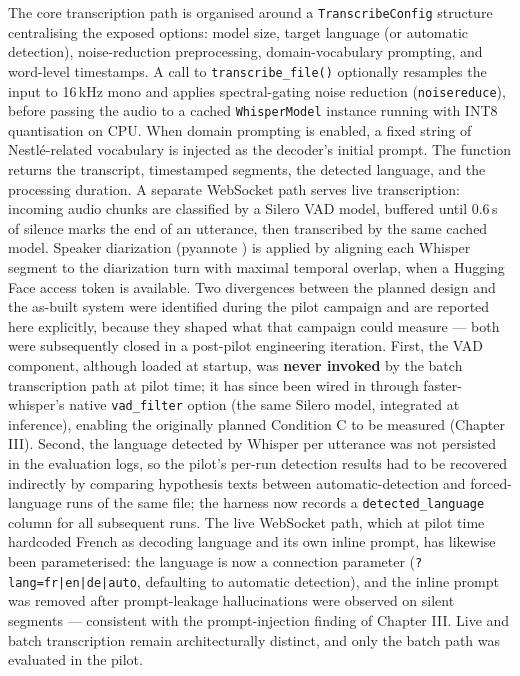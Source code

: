 \documentclass[12pt]{report}
\begin{document}
The core transcription path is organised around a \texttt{TranscribeConfig} structure centralising the exposed options: model size, target language (or automatic detection), noise-reduction preprocessing, domain-vocabulary prompting, and word-level timestamps. A call to \texttt{transcribe\_file()} optionally resamples the input to 16\,kHz mono and applies spectral-gating noise reduction (\texttt{noisereduce}), before passing the audio to a cached \texttt{WhisperModel} instance running with INT8 quantisation on CPU. When domain prompting is enabled, a fixed string of Nestl\'e-related vocabulary is injected as the decoder's initial prompt. The function returns the transcript, timestamped segments, the detected language, and the processing duration. A separate WebSocket path serves live transcription: incoming audio chunks are classified by a Silero VAD model, buffered until 0.6\,s of silence marks the end of an utterance, then transcribed by the same cached model. Speaker diarization (pyannote \cite{bredin2020pyannote}) is applied by aligning each Whisper segment to the diarization turn with maximal temporal overlap, when a Hugging Face access token is available.
Two divergences between the planned design and the as-built system were identified during the pilot campaign and are reported here explicitly, because they shaped what that campaign could measure --- both were subsequently closed in a post-pilot engineering iteration. First, the VAD component, although loaded at startup, was \textbf{never invoked} by the batch transcription path at pilot time; it has since been wired in through faster-whisper's native \texttt{vad\_filter} option (the same Silero model, integrated at inference), enabling the originally planned Condition C to be measured (Chapter III). Second, the language detected by Whisper per utterance was not persisted in the evaluation logs, so the pilot's per-run detection results had to be recovered indirectly by comparing hypothesis texts between automatic-detection and forced-language runs of the same file; the harness now records a \texttt{detected\_language} column for all subsequent runs. The live WebSocket path, which at pilot time hardcoded French as decoding language and its own inline prompt, has likewise been parameterised: the language is now a connection parameter (\texttt{?lang=fr|en|de|auto}, defaulting to automatic detection), and the inline prompt was removed after prompt-leakage hallucinations were observed on silent segments --- consistent with the prompt-injection finding of Chapter III. Live and batch transcription remain architecturally distinct, and only the batch path was evaluated in the pilot.
\end{document}
